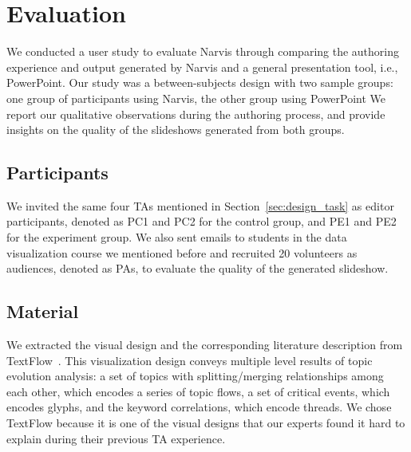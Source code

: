 \section{Evaluation}

We conducted a user study to evaluate Narvis through comparing the authoring experience and output generated by Narvis and a general presentation tool, i.e., PowerPoint.
Our study was a between-subjects design with two sample groups: one group of participants using Narvis, the other group using PowerPoint
We report our qualitative observations during the authoring process, and provide insights on the quality of the slideshows generated from both groups.

\subsection{Participants}
We invited the same four TAs mentioned in Section~\ref{sec:design_task} as editor participants, denoted as PC1 and PC2 for the control group, and PE1 and PE2 for the experiment group. We also sent emails to students in the data visualization course we mentioned before and recruited 20 volunteers as audiences, denoted as PAs, to evaluate the quality of the generated slideshow. 
\subsection{Material}
We extracted the visual design and the corresponding literature description from TextFlow~\cite{cui_textflow:_2011}. 
This visualization design conveys multiple level results of topic evolution analysis: a set of topics with splitting/merging relationships among each other, which encodes a series of topic flows, a set of critical events, which encodes glyphs, and the keyword correlations, which encode threads. 
We chose TextFlow because it is one of the visual designs that our experts found it hard to explain during their previous TA experience.


